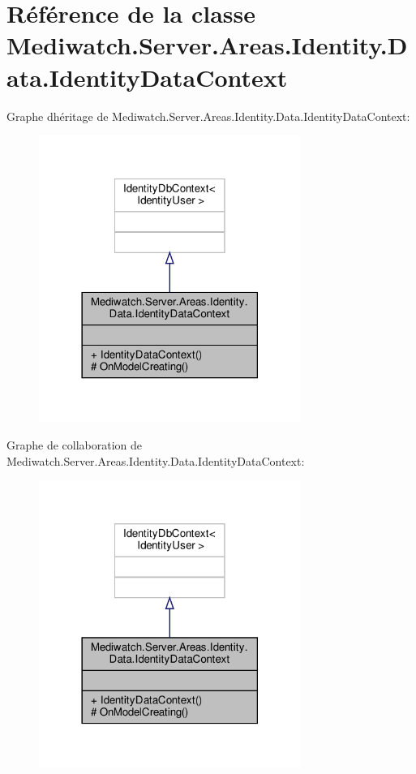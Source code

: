\hypertarget{class_mediwatch_1_1_server_1_1_areas_1_1_identity_1_1_data_1_1_identity_data_context}{}\section{Référence de la classe Mediwatch.\+Server.\+Areas.\+Identity.\+Data.\+Identity\+Data\+Context}
\label{class_mediwatch_1_1_server_1_1_areas_1_1_identity_1_1_data_1_1_identity_data_context}


Graphe d\textquotesingle{}héritage de Mediwatch.\+Server.\+Areas.\+Identity.\+Data.\+Identity\+Data\+Context\+:\nopagebreak
\begin{figure}[H]
\begin{center}
\leavevmode
\includegraphics[width=242pt]{class_mediwatch_1_1_server_1_1_areas_1_1_identity_1_1_data_1_1_identity_data_context__inherit__graph}
\end{center}
\end{figure}


Graphe de collaboration de Mediwatch.\+Server.\+Areas.\+Identity.\+Data.\+Identity\+Data\+Context\+:\nopagebreak
\begin{figure}[H]
\begin{center}
\leavevmode
\includegraphics[width=242pt]{class_mediwatch_1_1_server_1_1_areas_1_1_identity_1_1_data_1_1_identity_data_context__coll__graph}
\end{center}
\end{figure}

